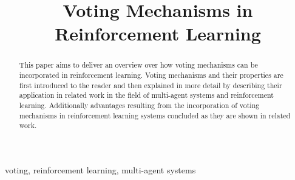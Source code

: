 \documentclass[conference]{IEEEtran}
\begin{document}
\title{Voting Mechanisms in Reinforcement Learning}

\author{
}

\maketitle


\begin{abstract}
This paper aims to deliver an overview over how voting mechanisms can be incorporated in reinforcement learning.
Voting mechanisms and their properties are first introduced to the reader and then explained in more detail by describing their application in related work in the field of multi-agent systems and reinforcement learning.
Additionally advantages resulting from the incorporation of voting mechanisms in reinforcement learning systems concluded as they are shown in related work.
\end{abstract}

\begin{IEEEkeywords}
voting, reinforcement learning, multi-agent systems
\end{IEEEkeywords}

\end{document}
